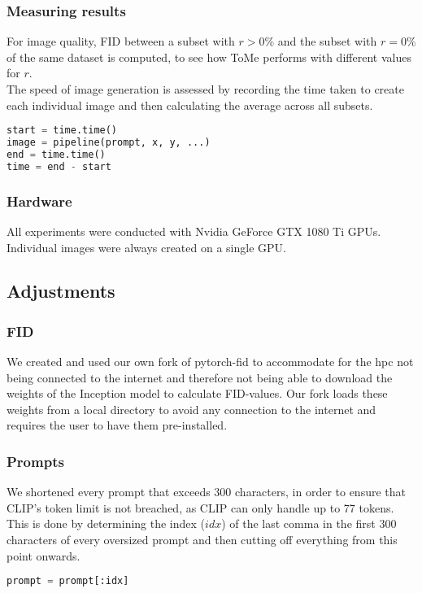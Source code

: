 \subsubsection*{Measuring results}
For image quality, FID between a subset with \(r > 0\%\) and the subset with \(r = 0\%\) of the same dataset is computed, to see how ToMe performs with different values for \(r\).\\
The speed of image generation is assessed by recording the time taken to create each individual image and then calculating the average across all subsets.
\begin{lstlisting}[language=Python]
start = time.time()
image = pipeline(prompt, x, y, ...)
end = time.time()
time = end - start
\end{lstlisting}



\subsubsection*{Hardware}
All experiments were conducted with Nvidia GeForce GTX 1080 Ti GPUs. Individual images were always created on a single GPU.



\subsection{Adjustments}
\subsubsection*{FID}
We created and used our own fork of pytorch-fid \cite{Seitzer2020FID} to accommodate for the hpc not being connected to the internet and therefore not being able to download the weights of the Inception model to calculate FID-values. Our fork loads these weights from a local directory to avoid any connection to the internet and requires the user to have them pre-installed.



\subsubsection*{Prompts}
We shortened every prompt that exceeds 300 characters, in order to ensure that CLIP's token limit is not breached, as CLIP can only handle up to 77 tokens.
This is done by determining the index (\(idx\)) of the last comma in the first 300 characters of every oversized prompt and then cutting off everything from this point onwards.
\begin{lstlisting}[language=Python]
prompt = prompt[:idx]
\end{lstlisting}


